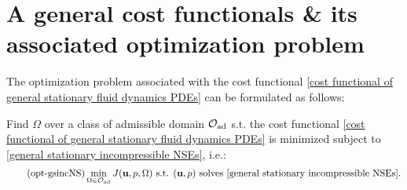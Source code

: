 \documentclass[oneside]{book}
\numberwithin{equation}{section}
\begin{document}
\section{A general cost functionals \& its associated optimization problem}
The optimization problem associated with the cost functional \eqref{cost functional of general stationary fluid dynamics PDEs} can be formulated as follows:

Find $\Omega$ over a class of admissible domain $\mathcal{O}_{\rm ad}$ s.t. the cost functional \eqref{cost functional of general stationary fluid dynamics PDEs} is minimized subject to \eqref{general stationary incompressible NSEs}, i.e.:
\begin{align}
    \label{optimization problem for general stationary incompressible NSEs}
    \tag{opt-gsincNS}
    \min_{\Omega\in\mathcal{O}_{\rm ad}} J({\bf u},p,\Omega) \mbox{ s.t. } ({\bf u},p) \mbox{ solves } \eqref{general stationary incompressible NSEs}.
\end{align}


\printbibliography[heading=bibintoc]
\end{document}
